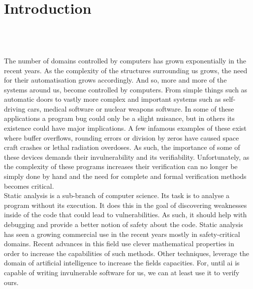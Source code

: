 
\setcounter{chapter}{0}

\chapter{Introduction}
\mbox{}\\
\mbox{}\\
\mbox{}\\
The number of domains controlled by computers has grown exponentially in the recent years. As the complexity of the structures surrounding us grows, the need for their automatisation grows accordingly. And so, more and more of the systems around us, become controlled by computers. From simple things such as automatic doors to vastly more complex and important systems such as self-driving cars, medical software or nuclear weapons software. In some of these applications a program bug could only be a slight nuisance, but in others its existence could have major implications. A few infamous examples of these exist where buffer overflows, rounding errors or division by zeros have caused space craft crashes or lethal radiation overdoses. As such, the importance of some of these devices demands their invulnerability and its verifiability. Unfortunately, as the complexity of these programs increases their verification can no longer be simply done by hand and the need for complete and formal verification methods becomes critical.\\
Static analysis is a sub-branch of computer science. Its task is to analyse a program without its execution. It does this in the goal of discovering weaknesses inside of the code that could lead to vulnerabilities. As such, it should help with debugging and provide a better notion of safety about the code. Static analysis has seen a growing commercial use in the recent years mostly in safety-critical domains. Recent advances in this field use clever mathematical properties in order to increase the capabilities of such methods. Other techniques, leverage the domain of artificial intelligence to increase the fields capacities. For, until ai is capable of writing invulnerable software for us, we can at least use it to verify ours.
